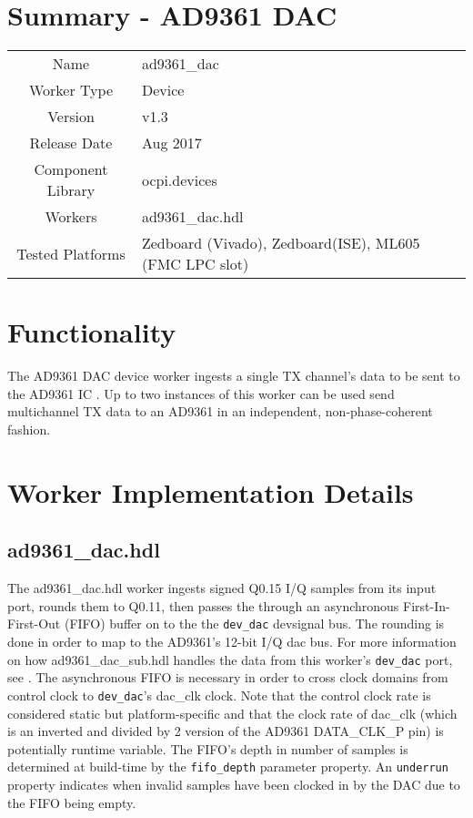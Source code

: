 \documentclass{article}
\author{} %
\date{Version \docVersion} %
\title{\docTitle}
\def\docVersion{1.3}
\def\devsignal{devsignal}
\def\comp{ad9361\_dac}
\def\Comp{AD9361 DAC}
\begin{document}
\section*{Summary - \Comp}
\begin{tabular}{|c|M{13.5cm}|}
	\hline
	                  &                  \\
	\hline
	Name              & \comp            \\
	\hline
	Worker Type       & Device           \\
	\hline
	Version           & v\docVersion     \\
	\hline
	Release Date      & Aug 2017         \\
	\hline
	Component Library & ocpi.devices     \\
	\hline
	Workers           & \comp.hdl        \\
	\hline
	Tested Platforms  &  Zedboard (Vivado), Zedboard(ISE), ML605 (FMC LPC slot) \\
	\hline
\end{tabular}

\section*{Functionality}
	The \Comp{} device worker ingests a single TX channel's data to be sent to the AD9361 IC \cite{ad9361}. Up to two instances of this worker can be used send multichannel TX data to an AD9361 in an independent, non-phase-coherent fashion.
\section*{Worker Implementation Details}
\subsection*{\comp.hdl}
The \comp{}.hdl worker ingests signed Q0.15 I/Q samples from its input port, rounds them to Q0.11, then passes the through an asynchronous First-In-First-Out (FIFO) buffer on to the the \verb+dev_dac+ \devsignal{} bus. The rounding is done in order to map to the AD9361's 12-bit I/Q dac bus\cite{adi_ug570}. For more information on how ad9361\_dac\_sub.hdl handles the data from this worker's \verb+dev_dac+ port, see \cite{dac_sub_comp_datasheet}. The asynchronous FIFO is necessary in order to cross clock domains from control clock to \verb+dev_dac+'s dac\_clk clock. Note that the control clock rate is considered static but platform-specific and that the clock rate of dac\_clk (which is an inverted and divided by 2 version of the AD9361 DATA\_CLK\_P pin\cite{dac_sub_comp_datasheet}) is potentially runtime variable. The FIFO's depth in number of samples is determined at build-time by the \verb+fifo_depth+ parameter property. An \verb+underrun+ property indicates when invalid samples have been clocked in by the DAC due to the FIFO being empty. 
\end{document}
